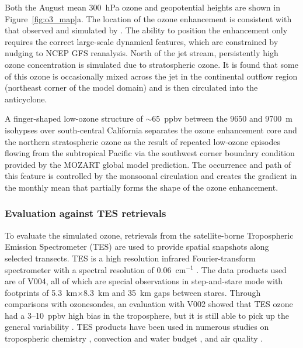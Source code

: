 Both the August mean 300~hPa ozone and geopotential heights are shown in
Figure~\ref{fig:o3_map}a. The
location of the ozone enhancement is consistent with that observed and simulated by
\citet{Cooper:2007cr}. The ability to position the enhancement only requires the correct
large-scale dynamical features, which are constrained by nudging to NCEP GFS reanalysis.
North of the jet stream, persistently high ozone
concentration is simulated due to stratospheric ozone. It is found that some of this
ozone is occasionally mixed across the jet in the continental outflow region (northeast
corner of the model domain) and is then circulated into the anticyclone.

A finger-shaped low-ozone structure of $\sim65$~ppbv between the 9650
and 9700~m isohypses over south-central California separates the ozone enhancement
core and the northern stratospheric ozone as the result of repeated
low-ozone episodes flowing from the subtropical Pacific via the southwest corner boundary condition
provided by the MOZART global model prediction. The occurrence and path of this feature is controlled
by the monsoonal circulation and creates the gradient in the monthly mean that
partially forms the shape of the ozone enhancement.

\subsubsection{Evaluation against TES retrievals}\label{sect:val/o3/tes}


To evaluate the simulated ozone, retrievals from the satellite-borne
Tropospheric Emission Spectrometer (TES) are used to provide spatial snapshots
along selected transects. TES is a high resolution infrared Fourier-transform
spectrometer with a spectral resolution of 0.06~cm$^{-1}$ \citep{Beer:2006fk}.
The data products used are of V004, all of which are special observations in
step-and-stare mode with footprints of 5.3~km$\times$8.3~km and 35~km gaps
between stares. Through comparisons with ozonesondes, an evaluation with
V002 showed that TES ozone had a 3--10~ppbv high bias in the troposphere,
but it is still able to pick up the general variability \citep{Nassar:2008mw}. TES
products have been used in numerous studies on tropospheric chemistry
\citep[e.g.][]{Hegarty:2010vn,Voulgarakis:2011fk}, convection and water budget
\citep[e.g.][]{Brown:2008zr,Risi:2010ys}, and air quality
\citep[e.g.][]{McMillan:2010kx,Wang:2011uq}.

